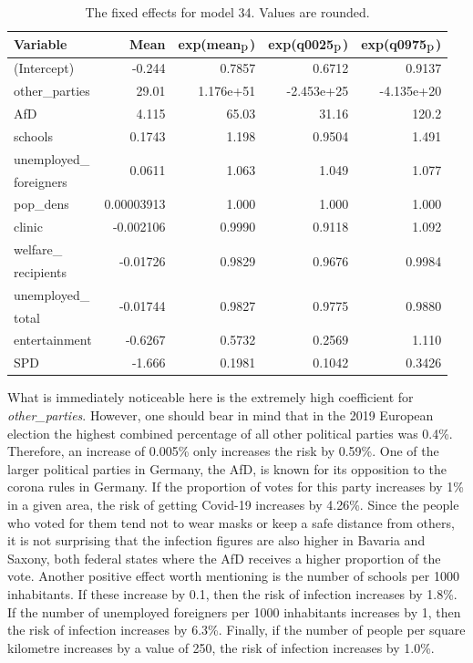 \begin{table}[H] 
\caption{The fixed effects for model 34. Values are rounded. \label{fixedAllGermany}}
\begin{tabular}{l r r r r}
\toprule
\textbf{Variable}	& \textbf{Mean}	& \textbf{exp(mean$_{\hbox{p}}$)} & \textbf{exp(q0025$_{\hbox{p}}$)} & \textbf{exp(q0975$_{\hbox{p}}$)} \\
\midrule
(Intercept) & -0.244 & 0.7857 & 0.6712 & 0.9137\\
other\_parties & 29.01 & 1.176e+51  & -2.453e+25 & -4.135e+20 \\
AfD & 4.115 & 65.03 & 31.16 & 120.2\\
schools & 0.1743 & 1.198 & 0.9504 & 1.491\\
unemployed\_ & \multirow{2}{*}{0.0611} & \multirow{2}{*}{1.063} & \multirow{2}{*}{1.049} & \multirow{2}{*}{1.077}\\
foreigners \\
pop\_dens & 0.00003913 & 1.000 & 1.000 & 1.000\\
clinic & -0.002106 & 0.9990 & 0.9118 & 1.092\\
welfare\_ & \multirow{2}{*}{-0.01726} & \multirow{2}{*}{0.9829} & \multirow{2}{*}{0.9676} & \multirow{2}{*}{0.9984}\\
recipients \\
unemployed\_ & \multirow{2}{*}{-0.01744} & \multirow{2}{*}{0.9827} & \multirow{2}{*}{0.9775} & \multirow{2}{*}{0.9880}\\
total \\
entertainment & -0.6267 & 0.5732 & 0.2569 & 1.110\\
SPD & -1.666 & 0.1981  & 0.1042 & 0.3426\\
\bottomrule
\end{tabular}
\end{table}
What is immediately noticeable here is the extremely high coefficient for \textit{other\_parties}. However, one should bear in mind that in the 2019 European election the highest combined percentage of all other political parties was 0.4\%. Therefore, an increase of 0.005\% only increases the risk by 0.59\%. One of the larger political parties in Germany, the AfD, is known for its opposition to the corona rules in Germany. If the proportion of votes for this party increases by 1\% in a given area, the risk of getting Covid-19 increases by 4.26\%. Since the people who voted for them tend not to wear masks or keep a safe distance from others, it is not surprising that the infection figures are also higher in Bavaria and Saxony, both federal states where the AfD receives a higher proportion of the vote. Another positive effect worth mentioning is the number of schools per 1000 inhabitants. If these increase by 0.1, then the risk of infection increases by 1.8\%. If the number of unemployed foreigners per 1000 inhabitants increases by 1, then the risk of infection increases by 6.3\%. Finally, if the number of people per square kilometre increases by a value of 250, the risk of infection increases by 1.0\%.
